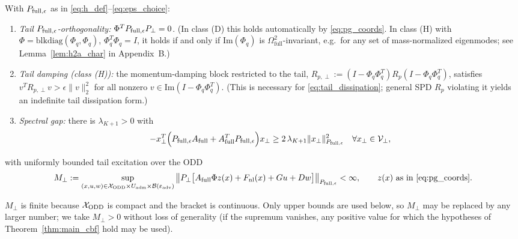 \begin{assumption}
\label{assump:tail_iss}
With \(P_{\mathrm{full},\epsilon}\) as in \eqref{eq:h_def}--\eqref{eq:eps_choice}:
\begin{enumerate}
\item[(H2a)] \emph{Tail \(P_{\mathrm{full},\epsilon}\)-orthogonality:} \(\Phi^TP_{\mathrm{full},\epsilon} P_\perp = 0\). (In class (D) this holds automatically by \eqref{eq:pg_coords}. In class (H) with \(\Phi = \mathrm{blkdiag}(\Phi_q,\Phi_q)\), \(\Phi_q^T\Phi_q = I\), it holds if and only if \(\mathrm{Im}(\Phi_q)\) is \(\Omega_{\mathrm{full}}^2\)-invariant, e.g.\ for any set of mass-normalized eigenmodes; see Lemma~\ref{lem:h2a_char} in Appendix~B.)
\item[(H2b)] \emph{Tail damping (class (H)):} the momentum-damping block restricted to the tail, \(R_{p,\perp} := (I - \Phi_q\Phi_q^T)R_p(I - \Phi_q\Phi_q^T)\), satisfies \(v^T R_{p,\perp} v > \epsilon\|v\|_2^2\) for all nonzero \(v \in \mathrm{Im}(I - \Phi_q\Phi_q^T)\). (This is necessary for \eqref{eq:tail_dissipation}; general SPD \(R_p\) violating it yields an indefinite tail dissipation form.)
\item[(H2c)] \emph{Spectral gap:} there is \(\lambda_{K+1} > 0\) with
\begin{equation}
\label{eq:tail_dissipation}
-x_\perp^T \Big(P_{\mathrm{full},\epsilon} A_{\mathrm{full}} + A_{\mathrm{full}}^T P_{\mathrm{full},\epsilon}\Big) x_\perp \ge 2\,\lambda_{K+1} \|x_\perp\|_{P_{\mathrm{full},\epsilon}}^2 \quad \forall x_\perp \in \mathcal{V}_\perp ,
\end{equation}
\end{enumerate}
with uniformly bounded tail excitation over the ODD
\begin{equation}
\label{eq:M_perp}
M_\perp := \sup_{(x,u,w) \in \mathcal{X}_{\mathrm{ODD}} \times U_{\mathrm{adm}} \times \mathcal{B}(\varepsilon_{\mathrm{adv}})} \big\|P_\perp\big[A_{\mathrm{full}}\Phi z(x) + F_{\mathrm{nl}}(x) + Gu + Dw\big]\big\|_{P_{\mathrm{full},\epsilon}} < \infty, \qquad z(x) \text{ as in \eqref{eq:pg_coords}}.
\end{equation}
\end{assumption}
\(M_\perp\) is finite because \(\mathcal{X}_{\mathrm{ODD}}\) is compact and the bracket is continuous. Only upper bounds are used below, so \(M_\perp\) may be replaced by any larger number; we take \(M_\perp > 0\) without loss of generality (if the supremum vanishes, any positive value for which the hypotheses of Theorem~\ref{thm:main_cbf} hold may be used).

